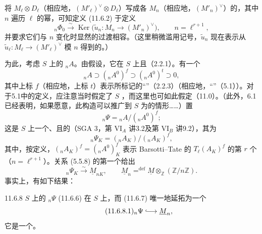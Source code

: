 将 $M_\ell\otimes D_\ell$（相应地，$(M'_\ell)^\vee\otimes D_\ell$）写成各 $M_n$（相应地，$(M'_n)^\vee$）的，其中 $n$ 遍历 $\ell$ 的幂，可知定义 (11.6.2) 于定义
\begin{equation}\tag{11.6.4}
 {}_n\Phi_0\xrightarrow{\sim}\operatorname{Ker}
 \bigl(\widetilde u_n:M_n\longrightarrow(M'_n)^\vee\bigr),
 \qquad n=\ell^{r+1},
\end{equation}
并要求它们与 $n$ 变化时显然的过渡相容。（这里稍微滥用记号，$\widetilde u_n$ 现在表示从 $\widetilde u_\ell:M_\ell\longrightarrow(M'_\ell)^\vee$ 模 $n$ 得到的。）

为此，考虑 $S$ 上的 ${}_nA$。由假设，它在 $S$ 上且（2.2.1）。有一个
\begin{equation}\tag{11.6.5}
 {}_nA\supset({}_nA^0)^f\supset({}_nA^0)^t\supset0,
\end{equation}
其中上标 $f$（相应地，上标 $t$）表示所标记的“”（2.2.3）（相应地，“”（5.1））。对于5.1中的定义，应注意当时假定了 $S$ ，而这里也可如此假定（11.0）。（此外，6.1已经表明，如果愿意，此构造可以推广到 $S$ 为的情形……）置
\begin{equation}\tag{11.6.6}
 {}_n\Psi={}_nA/({}_nA^0)^f;
\end{equation}
这是 $S$ 上一个、且的（SGA 3，第 VI$_A$ 讲3.2及第 VI$_B$ 讲9.2），其为
\[
 {}_n\Psi_K=({}_nA_K)/({}_nA_K)^f,
\]
其中，按定义，$({}_nA_K)^f=({}_nA^0)^f_K$ 表示 Barsotti--Tate 的 $T_\ell(A_K)^f$ 的第 $r$ 个（$n=\ell^{r+1}$）。关系 (5.5.8) 的第一个给出
\begin{equation}\tag{11.6.7}
 {}_n\Psi_K\xrightarrow{\sim}\underline M_{nK},
 \qquad \underline M_n\mathrel{\mathop=^{\mathrm{def}}}
 \underline M\otimes_{\mathbb Z}(\mathbb Z/n\mathbb Z).
\end{equation}
事实上，有如下结果：
\begin{SGAresult}{}{11.6.8}
$S$ 上的 ${}_n\Psi$ (11.6.6) 在 $S$ 上，而 (11.6.7) 唯一地延拓为一个
\begin{equation}\tag{11.6.8.1}
 {}_n\Psi\lhook\joinrel\longrightarrow\underline M_n,
\end{equation}
它是一个。
\end{SGAresult}
